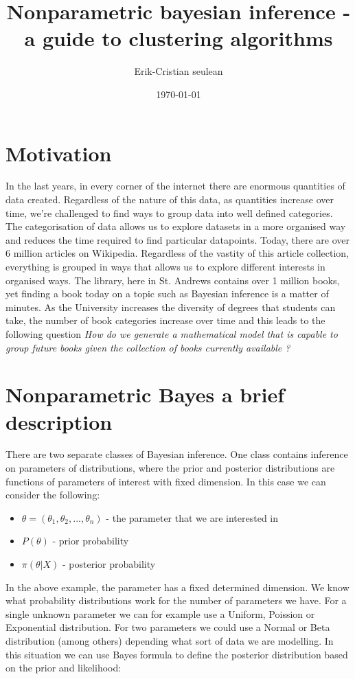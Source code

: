 \documentclass{article}
\author{Erik-Cristian seulean}
\title{Nonparametric bayesian inference - a guide to clustering algorithms}
\date{\today}
\begin{document}
\maketitle
\section{Motivation}

In the last years, in every corner of the internet there are enormous quantities of data created. 
Regardless of the nature of this data, as quantities increase over time, we're challenged to find
ways to group data into well defined categories. The categorisation of data allows us to explore 
datasets in a more organised way and reduces the time required to find particular datapoints. 
Today, there are over 6 million articles on Wikipedia. Regardless of the vastity of this article
collection, everything is grouped in ways that allows us to explore different interests in
organised ways. The library, here in St. Andrews contains over 1 million books, yet finding a book
today on a topic such as Bayesian inference is a matter of minutes. As the University increases the
diversity of degrees that students can take, the number of book categories increase over time and 
this leads to the following question \textit{How do we generate a mathematical model that is capable
to group future books given the collection of books currently available ?}

\section{Nonparametric Bayes a brief description}
There are two separate classes of Bayesian inference. One class contains inference on
parameters of distributions, where the prior and posterior distributions are functions of parameters of
interest with fixed dimension. In this case we can consider the following: 

\begin{itemize}
    \item $\theta = (\theta_{1}, \theta_{2}, ..., \theta_{n})$ - the parameter that we are interested in 
    \item $P(\theta)$ - prior probability
    \item $\pi(\theta|X)$ - posterior probability
\end{itemize}

In the above example, the parameter has a fixed determined dimension. We know what probability distributions
work for the number of parameters we have. For a single unknown parameter we can for example use a Uniform, 
Poission or Exponential distribution. For two parameters we could use a Normal or Beta distribution (among others)
depending what sort of data we are modelling. 
In this situation we can use Bayes formula to define the posterior distribution based on the prior and likelihood:
\end{document}
